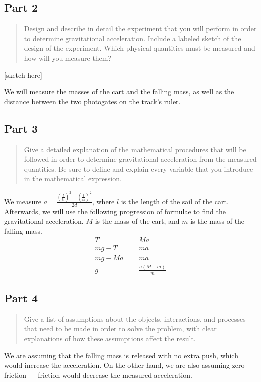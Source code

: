 \documentclass[10pt]{extarticle}
\begin{document}
{\subsection*{Part 2}
\begin{quote}
	Design and describe in detail the experiment that you will perform in order to determine gravitational acceleration.  Include a labeled sketch of the design of the experiment.  Which physical quantities must be measured and how will you measure them?
\end{quote}
[sketch here]

We will measure the masses of the cart and the falling mass, as well as the distance between the two photogates on the track's ruler.
\subsection*{Part 3}
\begin{quote}
	Give a detailed explanation of the mathematical procedures that will be followed in order to determine gravitational acceleration from the measured quantities.  Be sure to define and explain every variable that you introduce in the mathematical expression.
\end{quote}
We measure $a = \frac{\left(\frac{l}{t_1}\right)^2 - \left(\frac{l}{t_0}\right)^2}{2d}$, where $l$ is the length of the sail of the cart. Afterwards, we will use the following progression of formulae to find the gravitational acceleration. $M$ is the mass of the cart, and $m$ is the mass of the falling mass.
\begin{align*}
	T & = Ma \\
	mg - T &= ma \\
	mg - Ma &= ma \\
	g &= \frac{a(M+m)}{m}
\end{align*}
\subsection*{Part 4}
\begin{quote}
	Give a list of assumptions about the objects, interactions, and processes that need to be made in order to solve the problem, with clear explanations of how these assumptions affect the result.
\end{quote}
We are assuming that the falling mass is released with no extra push, which would increase the acceleration. On the other hand, we are also assuming zero friction — friction would decrease the measured acceleration.
}
\end{document}
